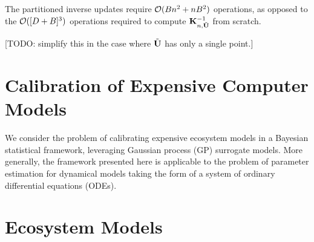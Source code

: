 \documentclass[12pt]{article}
\begin{document}
The partitioned inverse updates require $\BigO(\Nbatch \designIdx^2 + \designIdx \Nbatch^2)$ operations, as opposed to the 
$\BigO([\Npar + \Nbatch]^3)$ operations required to compute $\KerMat[\designIdx, \batchMat]^{-1}$ from scratch. 
 
 [TODO: simplify this in the case where $\batchMat$ has only a single point.]













\section{Calibration of Expensive Computer Models}
We consider the problem of calibrating expensive ecosystem models in a Bayesian statistical framework, leveraging 
Gaussian process (GP) surrogate models. More generally, the framework presented here is applicable to the problem of parameter 
estimation for dynamical models taking the form of a system of ordinary differential equations (ODEs). 

\section{Ecosystem Models}
\end{document}
